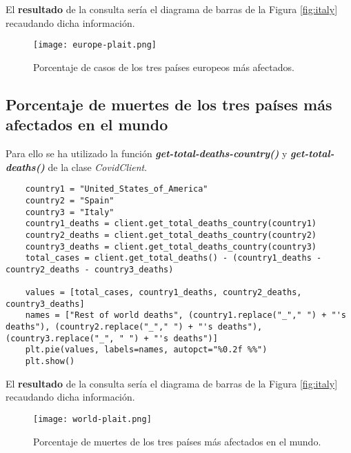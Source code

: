 \documentclass[11pt]{diazessay} %
\begin{document}
El \textbf{resultado} de la consulta sería el diagrama de barras de la Figura \ref{fig:italy} recaudando dicha información.
\clearpage

\begin{figure}[h!]
	\centering
	\texttt{[image: europe-plait.png]}
	\caption{Porcentaje de casos de los tres países europeos más afectados. \cite{matplotlib}}
	\label{fig:europe-plait}
\end{figure}


\subsection*{Porcentaje de muertes de los tres países más afectados en el mundo}
Para ello se ha utilizado la función \textit{\textbf{get-total-deaths-country()}} y \textit{\textbf{get-total-deaths()}} \cite{jupyter} de la clase \textit{CovidClient}.

\lstset{language=Python}
\begin{lstlisting}
	country1 = "United_States_of_America"
	country2 = "Spain"
	country3 = "Italy"
	country1_deaths = client.get_total_deaths_country(country1)
	country2_deaths = client.get_total_deaths_country(country2)
	country3_deaths = client.get_total_deaths_country(country3)
	total_cases = client.get_total_deaths() - (country1_deaths - country2_deaths - country3_deaths)
	
	values = [total_cases, country1_deaths, country2_deaths, country3_deaths]
	names = ["Rest of world deaths", (country1.replace("_"," ") + "'s deaths"), (country2.replace("_"," ") + "'s deaths"), (country3.replace("_", " ") + "'s deaths")]
	plt.pie(values, labels=names, autopct="%0.2f %%")
	plt.show()
\end{lstlisting}

El \textbf{resultado} de la consulta sería el diagrama de barras de la Figura \ref{fig:italy} recaudando dicha información.

\begin{figure}[h!]
	\centering
	\texttt{[image: world-plait.png]}
	\caption{Porcentaje de muertes de los tres países más afectados en el mundo. \cite{matplotlib}}
	\label{fig:world-plait}
\end{figure}

\clearpage
\end{document}
